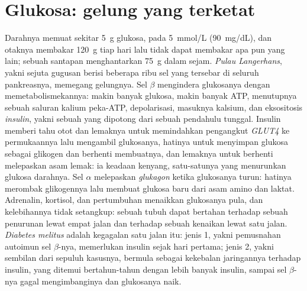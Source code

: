 \section{Glukosa: gelung yang terketat}

\begin{definition}\label{def:b3:endocrinology:glucose}
%
Darahnya memuat sekitar \qty{5}{g} glukosa, pada \qty{5}{mmol/L}
(\qty{90}{mg/dL}), dan otaknya membakar \qty{120}{g} tiap hari lalu tidak dapat membakar
apa pun yang lain; sebuah santapan menghantarkan \qty{75}{g} dalam sejam.
\emph{Pulau Langerhans}, yakni sejuta gugusan berisi beberapa ribu sel yang
tersebar di seluruh pankreasnya, memegang gelungnya. Sel $\beta$ mengindera
glukosanya dengan memetabolismekannya: makin banyak glukosa, makin banyak ATP, menutupnya
sebuah saluran kalium peka-ATP, depolarisasi, masuknya kalsium, dan
eksositosis \emph{insulin}, yakni sebuah  yang dipotong dari sebuah pendahulu
tunggal. Insulin memberi tahu otot dan lemaknya untuk memindahkan pengangkut
\emph{GLUT4} ke permukaannya lalu mengambil glukosanya, hatinya untuk menyimpan
glukosa sebagai glikogen dan berhenti membuatnya, dan lemaknya untuk berhenti melepaskan asam
lemak: ia  keadaan kenyang, satu-satunya yang menurunkan
glukosa darahnya. Sel $\alpha$ melepaskan \emph{glukagon} ketika glukosanya
turun: hatinya merombak glikogennya lalu membuat glukosa baru dari asam
amino dan laktat. Adrenalin, kortisol, dan  pertumbuhan menaikkan
glukosanya pula, dan kelebihannya tidak setangkup: sebuah tubuh dapat bertahan
terhadap sebuah penurunan lewat empat jalan dan terhadap sebuah kenaikan lewat satu jalan. \emph{Diabetes
melitus} adalah kegagalan satu jalan itu: jenis 1, yakni pemusnahan autoimun
sel $\beta$-nya, memerlukan insulin sejak hari pertama;
jenis 2, yakni sembilan dari sepuluh kasusnya, bermula sebagai kekebalan jaringannya terhadap
insulin, yang ditemui bertahun-tahun dengan lebih banyak insulin, sampai sel $\beta$-nya gagal
mengimbanginya dan glukosanya naik.
\end{definition}

